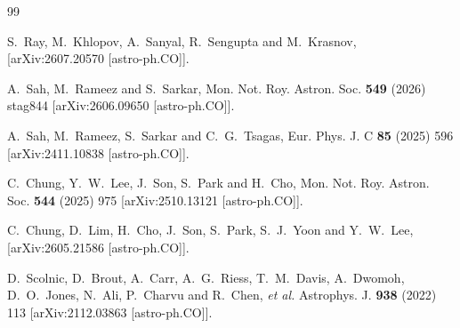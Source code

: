 \documentclass[aps,prl,twocolumn,showpacs,superscriptaddress,floatfix]{revtex4-2}
\begin{document}
\begin{thebibliography}{99}

% 

S.~Ray, M.~Khlopov, A.~Sanyal, R.~Sengupta and M.~Krasnov,
[arXiv:2607.20570 [astro-ph.CO]].

A.~Sah, M.~Rameez and S.~Sarkar,
Mon. Not. Roy. Astron. Soc. \textbf{549} (2026) stag844
[arXiv:2606.09650 [astro-ph.CO]].

A.~Sah, M.~Rameez, S.~Sarkar and C.~G.~Tsagas,
Eur. Phys. J. C \textbf{85} (2025) 596
[arXiv:2411.10838 [astro-ph.CO]].

C.~Chung, Y.~W.~Lee, J.~Son, S.~Park and H.~Cho,
Mon. Not. Roy. Astron. Soc. \textbf{544} (2025) 975
[arXiv:2510.13121 [astro-ph.CO]].

C.~Chung, D.~Lim, H.~Cho, J.~Son, S.~Park, S.~J.~Yoon and Y.~W.~Lee,
[arXiv:2605.21586 [astro-ph.CO]].

D.~Scolnic, D.~Brout, A.~Carr, A.~G.~Riess, T.~M.~Davis, A.~Dwomoh, D.~O.~Jones, N.~Ali, P.~Charvu and R.~Chen, \textit{et al.}
Astrophys. J. \textbf{938} (2022) 113
[arXiv:2112.03863 [astro-ph.CO]].

\end{thebibliography}
\end{document}
